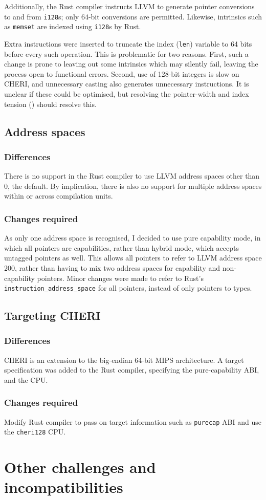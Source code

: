 \documentclass[dissertation.tex]{subfiles}
\begin{document}
Additionally, the Rust compiler instructs LLVM to generate
pointer conversions to and from \texttt{i128}s; only 64-bit conversions
are permitted.
Likewise, intrinsics such as \texttt{memset} are indexed using
\texttt{i128}s by Rust.

Extra instructions were inserted to truncate the index (\texttt{len})
variable to 64 bits before every such operation.
This is problematic for two reasons.
First, such a change is prone to leaving out some intrinsics which may
silently fail, leaving the process open to functional errors.
Second, use of 128-bit integers is slow on CHERI, and unnecessary
casting also generates unnecessary instructions.
It is unclear if these could be optimised, but resolving the
pointer-width and index tension () should
resolve this.


\subsection{Address spaces}
\label{sec:impl-addrspace}

\subsubsection{Differences}
There is no support in the Rust compiler to use LLVM address spaces
other than 0, the default.
By implication, there is also no support for multiple address spaces
within or across compilation units.

\subsubsection{Changes required}
As only one address space is recognised, I decided to use pure
capability mode, in which all pointers are capabilities, rather than
hybrid mode, which accepts untagged pointers as well.
This allows all pointers to refer to LLVM address space 200, rather than
having to mix two address spaces for capability and non-capability
pointers.
Minor changes were made to refer to Rust's
\texttt{instruction\_address\_space} for all pointers, instead of only
pointers to types.


\subsection{Targeting CHERI}

\subsubsection{Differences}
CHERI is an extension to the big-endian 64-bit MIPS architecture.
A target specification was added to the Rust compiler, specifying the
pure-capability ABI, and the CPU.

\subsubsection{Changes required}
Modify Rust compiler to pass on target information such as
\texttt{purecap} ABI and use the \texttt{cheri128} CPU.


\section{Other challenges and incompatibilities}
\end{document}
